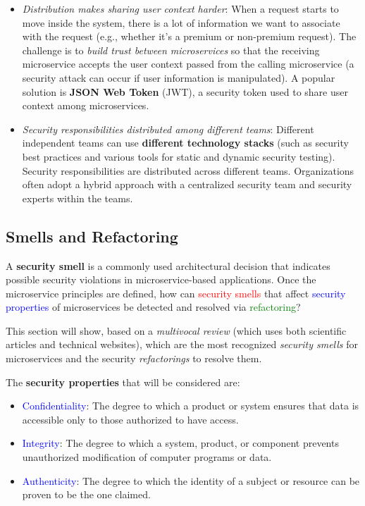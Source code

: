 \begin{itemize}
    \item \textit{Distribution makes sharing user context harder}: When a request starts to move inside the system, there is a lot of information we want to associate with the request (e.g., whether it’s a premium or non-premium request). The challenge is to \textit{build trust between microservices} so that the receiving microservice accepts the user context passed from the calling microservice (a security attack can occur if user information is manipulated). A popular solution is \textbf{JSON Web Token} (JWT), a security token used to share user context among microservices.
    \item \textit{Security responsibilities distributed among different teams}: Different independent teams can use \textbf{different technology stacks} (such as security best practices and various tools for static and dynamic security testing). Security responsibilities are distributed across different teams. Organizations often adopt a hybrid approach with a centralized security team and security experts within the teams.
\end{itemize}
\newpage
\subsection{Smells and Refactoring}

A \textbf{security smell} is a commonly used architectural decision that indicates possible security violations in microservice-based applications. Once the microservice principles are defined, how can \textcolor{red}{security smells} that affect \textcolor{blue}{security properties} of microservices be detected and resolved via \textcolor{green}{refactoring}?

This section will show, based on a \textit{multivocal review} (which uses both scientific articles and technical websites), which are the most recognized \textit{security smells} for microservices and the security \textit{refactorings} to resolve them. 

\noindent The \textbf{security properties} that will be considered are:

\begin{itemize}
    \item \textcolor{blue}{Confidentiality}: The degree to which a product or system ensures that data is accessible only to those authorized to have access.
    \item \textcolor{blue}{Integrity}: The degree to which a system, product, or component prevents unauthorized modification of computer programs or data.
    \item \textcolor{blue}{Authenticity}: The degree to which the identity of a subject or resource can be proven to be the one claimed.
\end{itemize}

